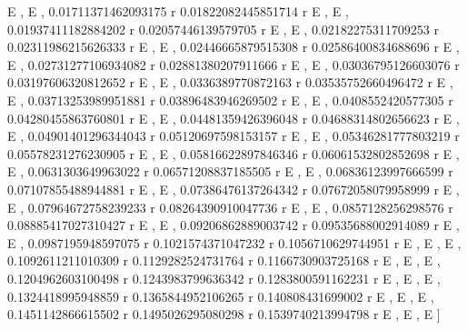\documentclass[a4paper,10pt]{article}
\begin{document}
\begin{eulernotebook}
\begin{euleroutput}
  E                     , E                     , 
   0.01711371462093175 r   0.01822082445851714 r
  E                     , E                     , 
   0.01937411182884202 r   0.02057446139579705 r
  E                     , E                     , 
   0.02182275311709253 r   0.02311986215626333 r
  E                     , E                     , 
   0.02446665879515308 r   0.02586400834688696 r
  E                     , E                     , 
   0.02731277106934082 r   0.02881380207911666 r
  E                     , E                     , 
   0.03036795126603076 r   0.03197606320812652 r
  E                     , E                     , 
   0.0336389770872163 r   0.03535752660496472 r
  E                    , E                     , 
   0.03713253989951881 r   0.03896483946269502 r
  E                     , E                     , 
   0.0408552420577305 r   0.04280455863760801 r
  E                    , E                     , 
   0.04481359426396048 r   0.04688314802656623 r
  E                     , E                     , 
   0.04901401296344043 r   0.05120697598153157 r
  E                     , E                     , 
   0.05346281777803219 r   0.05578231276230905 r
  E                     , E                     , 
   0.05816622897846346 r   0.06061532802852698 r
  E                     , E                     , 
   0.0631303649963022 r   0.06571208837185505 r
  E                    , E                     , 
   0.06836123997666599 r   0.07107855488944881 r
  E                     , E                     , 
   0.07386476137264342 r   0.07672058079958999 r
  E                     , E                     , 
   0.07964672758239233 r   0.08264390910047736 r
  E                     , E                     , 
   0.0857128256298576 r   0.08885417027310427 r
  E                    , E                     , 
   0.09206862889003742 r   0.09535688002914089 r
  E                     , E                     , 
   0.0987195948597075 r   0.1021574371047232 r   0.1056710629744951 r
  E                    , E                    , E                    , 
   0.1092611211010309 r   0.1129282524731764 r   0.1166730903725168 r
  E                    , E                    , E                    , 
   0.1204962603100498 r   0.1243983799636342 r   0.1283800591162231 r
  E                    , E                    , E                    , 
   0.1324418995948859 r   0.1365844952106265 r   0.140808431699002 r
  E                    , E                    , E                   , 
   0.1451142866615502 r   0.1495026295080298 r   0.1539740213994798 r
  E                    , E                    , E                    ]
  

\end{euleroutput}
\end{eulernotebook}
\end{document}
